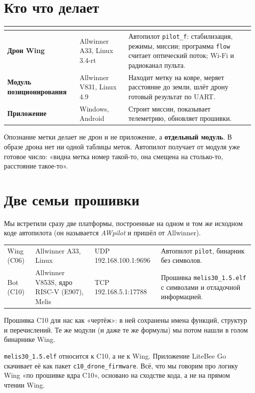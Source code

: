 \section{Кто что делает}

\begin{tabularx}{\textwidth}{@{}>{\sffamily\bfseries}p{3.1cm} p{3.7cm} Y@{}}
\toprule
{} &  &  \\ \midrule
Дрон Wing & Allwinner A33, Linux 3.4-rt & Автопилот \texttt{pilot\_f}: стабилизация, режимы, миссии; программа \texttt{flow} считает оптический поток; Wi-Fi и радиоканал пульта. \\
Модуль позиционирования & Allwinner V831, Linux 4.9 & Находит метку на ковре, меряет расстояние до земли, шлёт дрону готовый результат по UART. \\
Приложение & Windows, Android & Строит миссии, показывает телеметрию, обновляет прошивки. \\ \bottomrule
\end{tabularx}

\begin{zametka}
Опознание метки делает не дрон и не приложение, а \textbf{отдельный модуль}. В образе дрона нет ни одной таблицы меток. Автопилот получает от модуля уже готовое число: «видна метка номер такой-то, она смещена на столько-то, расстояние такое-то». \pr{}
\end{zametka}

\section{Две семьи прошивки}

Мы встретили сразу две платформы, построенные на одном и том же исходном коде автопилота (он называется \emph{AWpilot} и пришёл от Allwinner).

\begin{tabularx}{\textwidth}{@{}p{2.4cm} p{3.6cm} p{3.2cm} Y@{}}
\toprule
{} &  &  &  \\ \midrule
Wing (C06) & Allwinner A33, Linux & UDP 192.168.100.1:9696 & Автопилот \texttt{pilot}, бинарник без символов. \\
Bot (C10) & Allwinner V853S, ядро RISC-V (E907), Melis & TCP 192.168.5.1:17788 & Прошивка \texttt{melis30\_1.5.elf} с символами и отладочной информацией. \\ \bottomrule
\end{tabularx}

\vspace{4pt}
Прошивка C10 для нас как «чертёж»: в ней сохранены имена функций, структур и перечислений. Те же модули (и даже те же формулы) мы потом нашли в голом бинарнике Wing. \vyv{}

\begin{zametka}[Не путать]
\texttt{melis30\_1.5.elf} относится к C10, а не к Wing. Приложение LiteBee Go скачивает её как пакет \texttt{c10\_drone\_firmware}. Всё, что мы говорим про логику Wing «по прошивке ядра C10», основано на сходстве кода, а не на прямом чтении Wing. \pr{}
\end{zametka}
